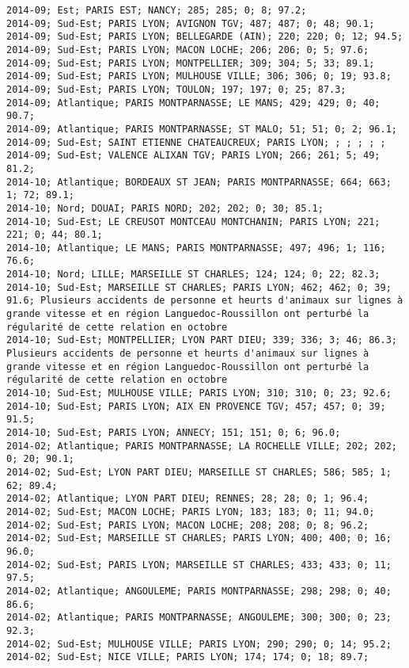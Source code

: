 \documentclass{article}
\begin{document}
\begin{Verbatim}[commandchars=\\\{\}]
2014-09; Est; PARIS EST; NANCY; 285; 285; 0; 8; 97.2; 
2014-09; Sud-Est; PARIS LYON; AVIGNON TGV; 487; 487; 0; 48; 90.1; 
2014-09; Sud-Est; PARIS LYON; BELLEGARDE (AIN); 220; 220; 0; 12; 94.5; 
2014-09; Sud-Est; PARIS LYON; MACON LOCHE; 206; 206; 0; 5; 97.6; 
2014-09; Sud-Est; PARIS LYON; MONTPELLIER; 309; 304; 5; 33; 89.1; 
2014-09; Sud-Est; PARIS LYON; MULHOUSE VILLE; 306; 306; 0; 19; 93.8; 
2014-09; Sud-Est; PARIS LYON; TOULON; 197; 197; 0; 25; 87.3; 
2014-09; Atlantique; PARIS MONTPARNASSE; LE MANS; 429; 429; 0; 40; 90.7; 
2014-09; Atlantique; PARIS MONTPARNASSE; ST MALO; 51; 51; 0; 2; 96.1; 
2014-09; Sud-Est; SAINT ETIENNE CHATEAUCREUX; PARIS LYON; ; ; ; ; ; 
2014-09; Sud-Est; VALENCE ALIXAN TGV; PARIS LYON; 266; 261; 5; 49; 81.2; 
2014-10; Atlantique; BORDEAUX ST JEAN; PARIS MONTPARNASSE; 664; 663; 1; 72; 89.1; 
2014-10; Nord; DOUAI; PARIS NORD; 202; 202; 0; 30; 85.1; 
2014-10; Sud-Est; LE CREUSOT MONTCEAU MONTCHANIN; PARIS LYON; 221; 221; 0; 44; 80.1; 
2014-10; Atlantique; LE MANS; PARIS MONTPARNASSE; 497; 496; 1; 116; 76.6; 
2014-10; Nord; LILLE; MARSEILLE ST CHARLES; 124; 124; 0; 22; 82.3; 
2014-10; Sud-Est; MARSEILLE ST CHARLES; PARIS LYON; 462; 462; 0; 39; 91.6; Plusieurs accidents de personne et heurts d'animaux sur lignes à grande vitesse et en région Languedoc-Roussillon ont perturbé la régularité de cette relation en octobre
2014-10; Sud-Est; MONTPELLIER; LYON PART DIEU; 339; 336; 3; 46; 86.3; Plusieurs accidents de personne et heurts d'animaux sur lignes à grande vitesse et en région Languedoc-Roussillon ont perturbé la régularité de cette relation en octobre
2014-10; Sud-Est; MULHOUSE VILLE; PARIS LYON; 310; 310; 0; 23; 92.6; 
2014-10; Sud-Est; PARIS LYON; AIX EN PROVENCE TGV; 457; 457; 0; 39; 91.5; 
2014-10; Sud-Est; PARIS LYON; ANNECY; 151; 151; 0; 6; 96.0; 
2014-02; Atlantique; PARIS MONTPARNASSE; LA ROCHELLE VILLE; 202; 202; 0; 20; 90.1; 
2014-02; Sud-Est; LYON PART DIEU; MARSEILLE ST CHARLES; 586; 585; 1; 62; 89.4; 
2014-02; Atlantique; LYON PART DIEU; RENNES; 28; 28; 0; 1; 96.4; 
2014-02; Sud-Est; MACON LOCHE; PARIS LYON; 183; 183; 0; 11; 94.0; 
2014-02; Sud-Est; PARIS LYON; MACON LOCHE; 208; 208; 0; 8; 96.2; 
2014-02; Sud-Est; MARSEILLE ST CHARLES; PARIS LYON; 400; 400; 0; 16; 96.0; 
2014-02; Sud-Est; PARIS LYON; MARSEILLE ST CHARLES; 433; 433; 0; 11; 97.5; 
2014-02; Atlantique; ANGOULEME; PARIS MONTPARNASSE; 298; 298; 0; 40; 86.6; 
2014-02; Atlantique; PARIS MONTPARNASSE; ANGOULEME; 300; 300; 0; 23; 92.3; 
2014-02; Sud-Est; MULHOUSE VILLE; PARIS LYON; 290; 290; 0; 14; 95.2; 
2014-02; Sud-Est; NICE VILLE; PARIS LYON; 174; 174; 0; 18; 89.7; 

\end{Verbatim}
\end{document}

